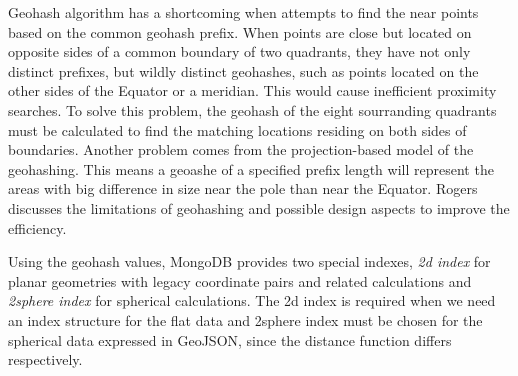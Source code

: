 \documentclass[a4paper,12pt]{article}
\begin{document}
Geohash algorithm has a shortcoming when attempts to find the near points based on the common geohash prefix. When points are close but located on opposite sides of a common boundary of two quadrants, they have not only distinct prefixes, but wildly distinct geohashes, such as points located on the other sides of the Equator or a meridian. This would cause inefficient proximity searches. To solve this problem, the geohash of the eight sourranding quadrants must be calculated to find the matching locations residing on both sides of boundaries. 
Another problem comes from the projection-based model of the geohashing. This means a geoashe of a specified prefix length will represent the areas with big difference in size near the pole than near the Equator. 
Rogers~\cite{www/geohash-limit} discusses the limitations of geohashing and possible design aspects to improve the efficiency.




Using the geohash values, MongoDB provides two special indexes, \textit{2d index} for planar geometries with legacy coordinate pairs and related calculations and \textit{2sphere index} for spherical calculations. The 2d index is required when we need an index structure for the flat data and 
2sphere index must be chosen for the spherical data expressed in GeoJSON, since the distance function differs respectively.
\end{document}

